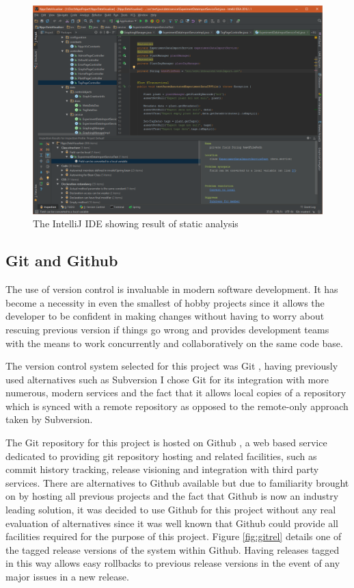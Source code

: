 \begin{figure}[H]
    \centering
    \includegraphics[width=\textwidth]{images/tools/intellij}
    \caption{The IntelliJ IDE showing result of static analysis}
    \label{fig:intellij}
\end{figure}

\subsection{Git and Github} \label{gitsection}

The use of version control is invaluable in modern software development. It has become a necessity in even the smallest of hobby projects since it allows the developer to be confident in making changes without having to worry about rescuing previous version if things go wrong and provides development teams with the means to work concurrently and collaboratively on the same code base. 

The version control system selected for this project was Git \cite{_git}, having previously used alternatives such as Subversion I chose Git for its integration with more numerous, modern services and the fact that it allows local copies of a repository which is synced with a remote repository as opposed to the remote-only approach taken by Subversion.

The Git repository for this project is hosted on Github \cite{_gitHub}, a web based service dedicated to providing git repository hosting and related facilities, such as commit history tracking, release visioning and integration with third party services. There are alternatives to Github available but due to familiarity brought on by hosting all previous projects and the fact that Github is now an industry leading solution, it was decided to use Github for this project without any real evaluation of alternatives since it was well known that Github could provide all facilities required for the purpose of this project. Figure \ref{fig:gitrel} details one of the tagged release versions of the system within Github. Having releases tagged in this way allows easy rollbacks to previous release versions in the event of any major issues in a new release. 

